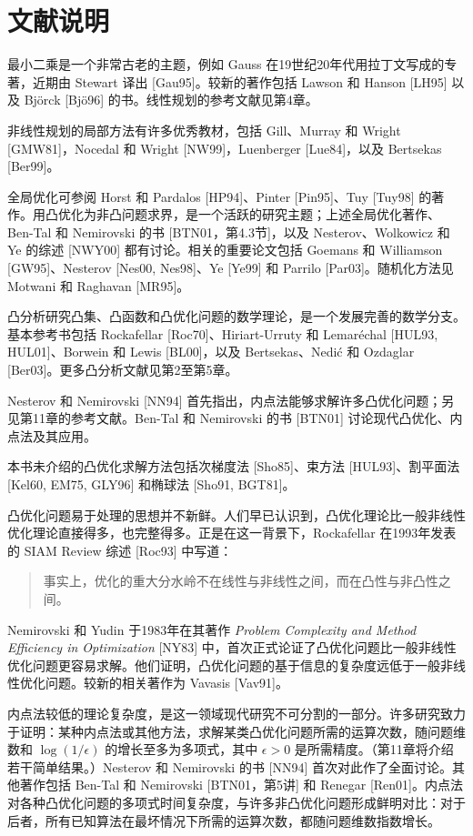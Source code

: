 \section*{文献说明}
最小二乘是一个非常古老的主题，例如 Gauss 在19世纪20年代用拉丁文写成的专著，近期由 Stewart 译出 [Gau95]。较新的著作包括 Lawson 和 Hanson [LH95] 以及 Bj\"orck [Bj\"o96] 的书。线性规划的参考文献见第4章。

非线性规划的局部方法有许多优秀教材，包括 Gill、Murray 和 Wright [GMW81]，Nocedal 和 Wright [NW99]，Luenberger [Lue84]，以及 Bertsekas [Ber99]。

全局优化可参阅 Horst 和 Pardalos [HP94]、Pinter [Pin95]、Tuy [Tuy98] 的著作。用凸优化为非凸问题求界，是一个活跃的研究主题；上述全局优化著作、Ben-Tal 和 Nemirovski 的书 [BTN01，第4.3节]，以及 Nesterov、Wolkowicz 和 Ye 的综述 [NWY00] 都有讨论。相关的重要论文包括 Goemans 和 Williamson [GW95]、Nesterov [Nes00, Nes98]、Ye [Ye99] 和 Parrilo [Par03]。随机化方法见 Motwani 和 Raghavan [MR95]。

凸分析研究凸集、凸函数和凸优化问题的数学理论，是一个发展完善的数学分支。基本参考书包括 Rockafellar [Roc70]、Hiriart-Urruty 和 Lemar\'echal [HUL93, HUL01]、Borwein 和 Lewis [BL00]，以及 Bertsekas、Nedi\'c 和 Ozdaglar [Ber03]。更多凸分析文献见第2至第5章。

Nesterov 和 Nemirovski [NN94] 首先指出，内点法能够求解许多凸优化问题；另见第11章的参考文献。Ben-Tal 和 Nemirovski 的书 [BTN01] 讨论现代凸优化、内点法及其应用。

本书未介绍的凸优化求解方法包括次梯度法 [Sho85]、束方法 [HUL93]、割平面法 [Kel60, EM75, GLY96] 和椭球法 [Sho91, BGT81]。

凸优化问题易于处理的思想并不新鲜。人们早已认识到，凸优化理论比一般非线性优化理论直接得多，也完整得多。正是在这一背景下，Rockafellar 在1993年发表的 SIAM Review 综述 [Roc93] 中写道：
\begin{quote}
事实上，优化的重大分水岭不在线性与非线性之间，而在凸性与非凸性之间。
\end{quote}

Nemirovski 和 Yudin 于1983年在其著作 \emph{Problem Complexity and Method Efficiency in Optimization} [NY83] 中，首次正式论证了凸优化问题比一般非线性优化问题更容易求解。他们证明，凸优化问题的基于信息的复杂度远低于一般非线性优化问题。较新的相关著作为 Vavasis [Vav91]。

内点法较低的理论复杂度，是这一领域现代研究不可分割的一部分。许多研究致力于证明：某种内点法或其他方法，求解某类凸优化问题所需的运算次数，随问题维数和 $\log(1/\epsilon)$ 的增长至多为多项式，其中 $\epsilon>0$ 是所需精度。（第11章将介绍若干简单结果。）Nesterov 和 Nemirovski 的书 [NN94] 首次对此作了全面讨论。其他著作包括 Ben-Tal 和 Nemirovski [BTN01，第5讲] 和 Renegar [Ren01]。内点法对各种凸优化问题的多项式时间复杂度，与许多非凸优化问题形成鲜明对比：对于后者，所有已知算法在最坏情况下所需的运算次数，都随问题维数指数增长。

